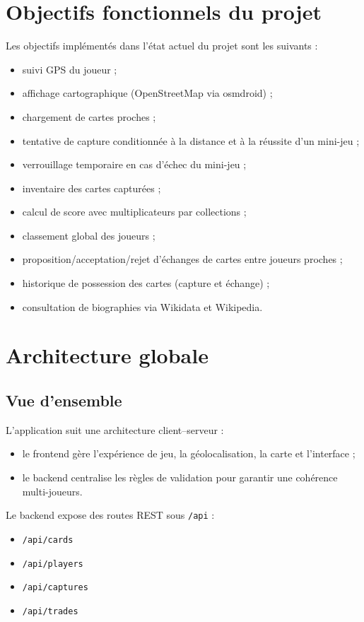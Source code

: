 \documentclass[11pt,a4paper]{article}
\begin{document}
\section{Objectifs fonctionnels du projet}
Les objectifs implémentés dans l'état actuel du projet sont les suivants :
\begin{itemize}[leftmargin=1.2cm]
  \item suivi GPS du joueur ;
  \item affichage cartographique (OpenStreetMap via osmdroid) ;
  \item chargement de cartes proches ;
  \item tentative de capture conditionnée à la distance et à la réussite d'un mini-jeu ;
  \item verrouillage temporaire en cas d'échec du mini-jeu ;
  \item inventaire des cartes capturées ;
  \item calcul de score avec multiplicateurs par collections ;
  \item classement global des joueurs ;
  \item proposition/acceptation/rejet d'échanges de cartes entre joueurs proches ;
  \item historique de possession des cartes (capture et échange) ;
  \item consultation de biographies via Wikidata et Wikipedia.
\end{itemize}

\section{Architecture globale}
\subsection{Vue d'ensemble}
L'application suit une architecture client--serveur :
\begin{itemize}[leftmargin=1.2cm]
  \item le frontend gère l'expérience de jeu, la géolocalisation, la carte et l'interface ;
  \item le backend centralise les règles de validation pour garantir une cohérence multi-joueurs.
\end{itemize}

Le backend expose des routes REST sous \texttt{/api} :
\begin{itemize}[leftmargin=1.2cm]
  \item \texttt{/api/cards}
  \item \texttt{/api/players}
  \item \texttt{/api/captures}
  \item \texttt{/api/trades}
\end{itemize}
\end{document}
